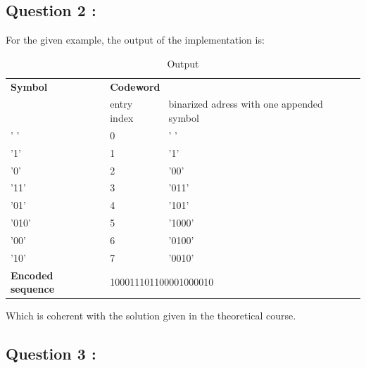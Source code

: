 \documentclass[titlepage]{article}
\begin{document}
\newpage

\subsection{Question 2 : }

For the given example, the output of the implementation is:

\begin{table}[h!]
    \centering
    \small
    \setlength{\tabcolsep}{4pt}
    \begin{tabular}{|p{3.5cm}|p{3cm}|p{3cm}|}
        \hline
        \multicolumn{1}{|p{3.5cm}|}{\textbf{Symbol}} & \multicolumn{2}{p{6cm}|}{\textbf{Codeword}}\\
        \cline{2-3} 
         & entry index & binarized adress with one appended symbol \\
        \hline
        ' ' & 0 & ' ' \\
        \hline
        '1' & 1 & '1' \\
        \hline
        '0' & 2 & '00' \\
        \hline
        '11' & 3 & '011' \\
        \hline
        '01' & 4 & '101' \\
        \hline
        '010' & 5 & '1000' \\
        \hline
        '00' & 6 & '0100' \\
        \hline
        '10' & 7 & '0010' \\
        \hline
        \multicolumn{1}{|p{3.5cm}|}{\textbf{Encoded sequence}} & \multicolumn{2}{p{6cm}|}{100011101100001000010} \\
        \hline
    \end{tabular}
    \caption{Output}
    \label{tab:q2}
\end{table}
Which is coherent with the solution given in the theoretical course.

\subsection{Question 3 : }
\end{document}
